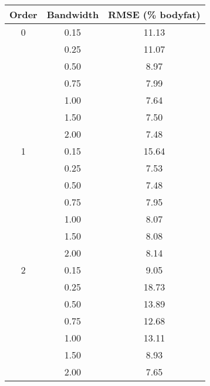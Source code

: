 \begin{tabular}{ccc}
\toprule
 Order &  Bandwidth & RMSE (\% bodyfat) \\
\midrule
    0 &  0.15 &             11.13 \\
      & 0.25 &            11.07 \\
      & 0.50 &              8.97 \\
     &  0.75 &               7.99 \\
     &  1.00 &             7.64 \\
    &   1.50 &               7.50 \\
    &   2.00 &              7.48 \\
\midrule
   1 &    0.15 &          15.64 \\
    &   0.25 &               7.53 \\
 &      0.50 &                7.48 \\
    &   0.75 &                7.95 \\
     &  1.00 &               8.07 \\
    &   1.50 &                8.08 \\
   &    2.00 &                8.14 \\
 \midrule
 2 &      0.15 &                 9.05 \\
   &    0.25 &                 18.73 \\
    &   0.50 &               13.89 \\
     &  0.75 &                  12.68 \\
    &   1.00 &                  13.11 \\
    &   1.50 &                 8.93 \\
    &   2.00 &                  7.65 \\
\bottomrule
\end{tabular}
